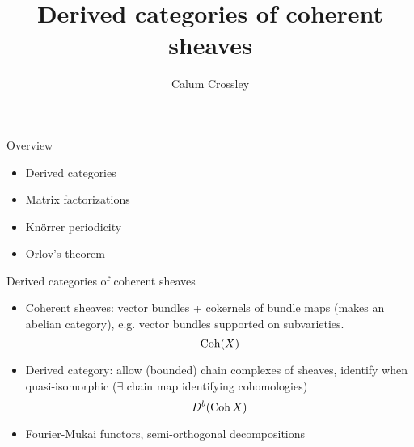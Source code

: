 \documentclass[10pt]{beamer}
\title{Derived categories of coherent sheaves}
\date{}
\author{Calum Crossley}
\begin{document}
\maketitle

\begin{frame}{Overview}
    \begin{itemize}
        \pause
        \item Derived categories \pause
        \item Matrix factorizations \pause
        \item Kn\"orrer periodicity \pause
        \item Orlov's theorem %
    \end{itemize}
\end{frame}

\begin{frame}{Derived categories of coherent sheaves}
    \begin{itemize}
        \item Coherent sheaves: vector bundles + cokernels of bundle maps (makes
            an abelian category), e.g. vector bundles supported on subvarieties.
            \begin{equation*}
                \operatorname{Coh}(X)
            \end{equation*}

        \item Derived category: allow (bounded) chain complexes of sheaves,
            identify when quasi-isomorphic ($\exists$ chain map identifying
            cohomologies)
            \begin{equation*}
                D^b(\operatorname{Coh} X)
            \end{equation*}

        \item Fourier-Mukai functors, semi-orthogonal decompositions
    \end{itemize}
\end{frame}
\end{document}
